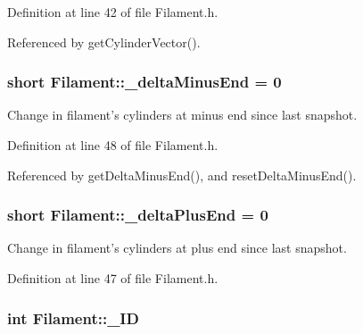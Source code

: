 Definition at line 42 of file Filament.\+h.



Referenced by get\+Cylinder\+Vector().

\hypertarget{classFilament_ac00eb37c21190ce574738d7f5259cf58}{
\subsubsection[{\+\_\+delta\+Minus\+End}]{\setlength{\rightskip}{0pt plus 5cm}short Filament\+::\+\_\+delta\+Minus\+End = 0\hspace{0.3cm}{\ttfamily [private]}}}\label{classFilament_ac00eb37c21190ce574738d7f5259cf58}


Change in filament's cylinders at minus end since last snapshot. 



Definition at line 48 of file Filament.\+h.



Referenced by get\+Delta\+Minus\+End(), and reset\+Delta\+Minus\+End().

\hypertarget{classFilament_ab22323b878792e2c309417f9b8435c97}{
\subsubsection[{\+\_\+delta\+Plus\+End}]{\setlength{\rightskip}{0pt plus 5cm}short Filament\+::\+\_\+delta\+Plus\+End = 0\hspace{0.3cm}{\ttfamily [private]}}}\label{classFilament_ab22323b878792e2c309417f9b8435c97}


Change in filament's cylinders at plus end since last snapshot. 



Definition at line 47 of file Filament.\+h.

\hypertarget{classFilament_a15071125666bbd624b9b290969872bdb}{
\subsubsection[{\+\_\+\+I\+D}]{\setlength{\rightskip}{0pt plus 5cm}int Filament\+::\+\_\+\+I\+D\hspace{0.3cm}{\ttfamily [private]}}}\label{classFilament_a15071125666bbd624b9b290969872bdb}


